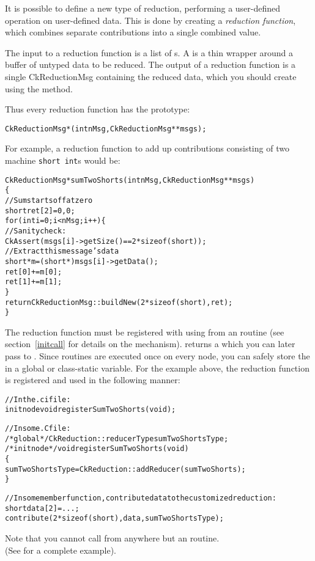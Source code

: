 It is possible to define a new type of reduction, performing a 
user-defined operation on user-defined data.  This is done by 
creating a {\em reduction function}, which 
combines separate contributions 
into a single combined value.

The input to a reduction function is a list of s.
A  is a thin wrapper around a buffer of untyped data
to be reduced.  
The output of a reduction function is a single CkReductionMsg
containing the reduced data, which you should create using the
 method.  

Thus every reduction function has the prototype:
\begin{alltt}
CkReductionMsg *(int nMsg,CkReductionMsg **msgs);
\end{alltt}

For example, a reduction function to add up contributions 
consisting of two machine {\tt short int}s would be:

\begin{alltt}
CkReductionMsg *sumTwoShorts(int nMsg,CkReductionMsg **msgs)
\{
  //Sum starts off at zero
  short ret[2]={0,0};
  for (int i=0;i<nMsg;i++) \{
    //Sanity check:
    CkAssert(msgs[i]->getSize()==2*sizeof(short));
    //Extract this message's data
    short *m=(short *)msgs[i]->getData();
    ret[0]+=m[0];
    ret[1]+=m[1];
  \}
  return CkReductionMsg::buildNew(2*sizeof(short),ret);
\}
\end{alltt}

The reduction function must be registered with \charmpp{} 
using  from
an  routine (see section~\ref{initcall} for details
on the  mechanism).   
returns a  which you can later 
pass to .  Since  routines are executed
once on every node, you can safely store the 
in a global or class-static variable.  For the example above, the reduction
function is registered and used in the following manner:

\begin{alltt}
//In the .ci file:
  initnode void registerSumTwoShorts(void);

//In some .C file:
/*global*/ CkReduction::reducerType sumTwoShortsType;
/*initnode*/ void registerSumTwoShorts(void)
\{
  sumTwoShortsType=CkReduction::addReducer(sumTwoShorts);
\}

//In some member function, contribute data to the customized reduction:
  short data[2]=...;
  contribute(2*sizeof(short),data,sumTwoShortsType);
\end{alltt}

Note that you cannot call 
from anywhere but an  routine.\\
(See  for a complete example).

